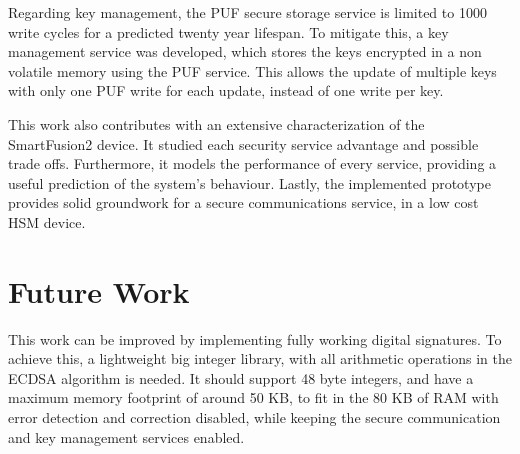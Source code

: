 Regarding key management, the PUF secure storage service is limited to 1000 write cycles for a predicted twenty year lifespan. To mitigate this, a key management service was developed, which stores the keys encrypted in a non volatile memory using the PUF service. This allows the update of multiple keys with only one PUF write for each update, instead of one write per key.

This work also contributes with an extensive characterization of the SmartFusion2 device. It studied each security service advantage and possible trade offs. Furthermore, it models the performance of every service, providing a useful prediction of the system's behaviour. Lastly, the implemented prototype provides solid groundwork for a secure communications service, in a low cost HSM device.

\section{Future Work} \label{chap:conclusion:future-work}

This work can be improved by implementing fully working digital signatures. To achieve this, a lightweight big integer library, with all arithmetic operations in the ECDSA algorithm is needed. It should support 48 byte integers, and have a maximum memory footprint of around 50 KB, to fit in the 80 KB of RAM with error detection and correction disabled, while keeping the secure communication and key management services enabled.
